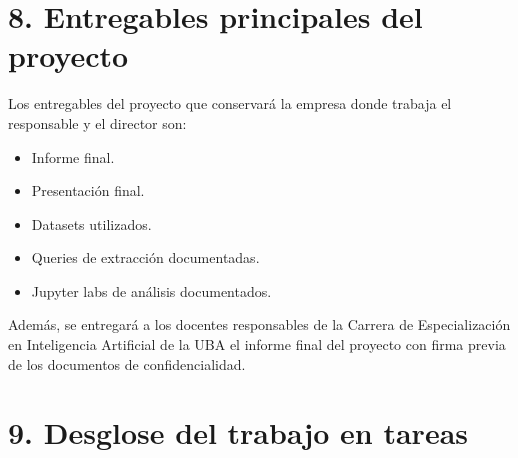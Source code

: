 \documentclass[
11pt, %
]{charter}
\begin{document}
\section{8. Entregables principales del proyecto}
\label{sec:entregables}

Los entregables del proyecto que conservará la empresa donde trabaja el responsable y el director son:

\begin{itemize}
 \item Informe final.
 \item Presentación final.
 \item Datasets utilizados.
 \item Queries de extracción documentadas.
 \item Jupyter labs de análisis documentados.
\end{itemize}

Además, se entregará a los docentes responsables de la Carrera de Especialización en Inteligencia Artificial de la UBA el informe final del proyecto con firma previa de los documentos de confidencialidad.

\section{9. Desglose del trabajo en tareas}
\label{sec:wbs}
\end{document}

